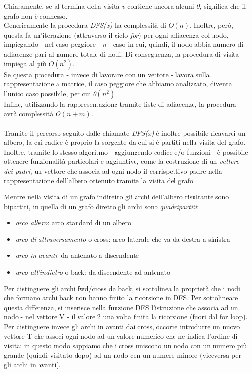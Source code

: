 Chiaramente, se al termina della visita \textit{v} contiene ancora alcuni \textit{0}, significa che il grafo non è connesso. \\
Genericamente la procedura \textit{DFS(x)} ha complessità di $O(n)$. Inoltre, però, questa fa un'iterazione (attraverso il ciclo \textit{for}) per ogni adiacenza col nodo, impiegando - nel caso peggiore - \textit{n} - caso in cui, quindi, il nodo abbia numero di adiacenze pari al numero totale di nodi. Di conseguenza, la procedura di visita impiega al più $O(n^2)$. \\
Se questa procedura - invece di lavorare con un vettore - lavora sulla rappresentazione a matrice, il caso peggiore che abbiamo analizzato, diventa l'unico caso possibile, per cui $\theta(n^2)$. \\
Infine, utilizzando la rappresentazione tramite liste di adiacenze, la procedura avrà complessità $O(n+m)$. \\\\
Tramite il percorso seguito dalle chiamate \textit{DFS(x)} è inoltre possibile ricavarci un albero, la cui radice è proprio la sorgente da cui si è partiti nella visita del grafo. \\
Inoltre, tramite lo stesso algoritmo - aggiungendo codice e/o funzioni - è possibile ottenere funzionalità particolari e aggiuntive, come la costruzione di un \textit{vettore dei padri}, un vettore che associa ad ogni nodo il corrispettivo padre nella rappresentazione dell'albero ottenuto tramite la visita del grafo.
\newpage


Mentre nella visita di un grafo indiretto gli archi dell'albero risultante sono bipartiti, in quella di un grafo diretto gli archi sono \textit{quadripartiti}:
\begin{itemize}
	\item \textit{arco albero}: arco standard di un albero
	\item \textit{arco di attraversamento} o cross: arco laterale che va da destra a sinistra
	\item \textit{arco in avanti}: da antenato a discendente
	\item \textit{arco all'indietro} o back: da discendente ad antenato
\end{itemize} 
Per distinguere gli archi fwd/cross da back, si sottolinea la proprietà che i nodi che formano archi back non hanno finito la ricorsione in DFS.
Per sottolineare questa differenza, si inserisce nella funzione DFS l'istruzione che associa ad un nodo - nel vettore V - il valore 2 una volta finita la ricorsione (fuori dal for loop).\\
Per distinguere invece gli archi in avanti dai cross, occorre introdurre un nuovo vettore T che associ ogni nodo ad un valore numerico che ne indica l'ordine di visita: in questo modo sappiamo che i cross uniscono un nodo con un numero più grande (quindi visitato dopo) ad un nodo con un numero minore (viceversa per gli archi in avanti).

